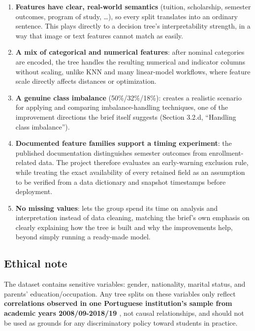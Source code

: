 \begin{enumerate}
  \item \textbf{Features have clear, real-world semantics} (tuition,
    scholarship, semester outcomes, program of study, \ldots), so every
    split translates into an ordinary sentence. This plays directly to a
    decision tree's interpretability strength, in a way that image or
    text features cannot match as easily.
  \item \textbf{A mix of categorical and numerical features}: after
    nominal categories are encoded, the tree handles the resulting
    numerical and indicator columns without scaling, unlike KNN and many
    linear-model workflows, where feature scale directly affects
    distances or optimization.
  \item \textbf{A genuine class imbalance} (50\%/32\%/18\%): creates a
    realistic scenario for applying and comparing imbalance-handling
    techniques, one of the improvement directions the brief itself
    suggests (Section 3.2.d, ``Handling class imbalance'').
  \item \textbf{Documented feature families support a timing experiment}:
    the published documentation distinguishes semester outcomes from
    enrollment-related data. The project therefore evaluates an early-warning
    exclusion rule, while treating the exact availability of every retained
    field as an assumption to be verified from a data dictionary and snapshot
    timestamps before deployment.
  \item \textbf{No missing values}: lets the group spend its time on
    analysis and interpretation instead of data cleaning, matching the
    brief's own emphasis on clearly explaining how the tree is built and
    why the improvements help, beyond simply running a ready-made model.
\end{enumerate}

\subsection{Ethical note}

The dataset contains sensitive variables: gender, nationality, marital
status, and parents' education/occupation. Any tree splits on these
variables only reflect \textbf{correlations observed in one Portuguese
institution's sample from academic years 2008/09-2018/19
\citep[Section~2]{realinho2022predicting}}, not causal relationships, and
should not be used as grounds for any discriminatory policy toward
students in practice.
